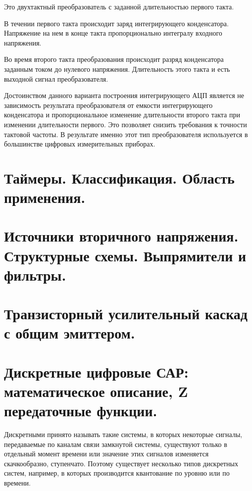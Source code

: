 \documentclass[unicode, 12pt, a4paper, oneside]{article}
\begin{document}
Это двухтактный преобразователь с заданной длительностью первого такта.

В течении первого такта происходит заряд интегрирующего конденсатора. Напряжение на нем в конце такта пропорционально интегралу входного напряжения.

Во время второго такта преобразования происходит разряд конденсатора заданным током до нулевого напряжения. Длительность этого такта и есть выходной сигнал преобразователя.

Достоинством данного варианта построения интегрирующего АЦП является не зависимость результата преобразователя от емкости интегрирующего конденсатора и пропорциональное изменение длительности второго такта при изменении длительности первого. Это позволяет снизить требования к точности тактовой частоты. В результате именно этот тип преобразователя используется в большинстве цифровых измерительных приборах.


\section{Таймеры. Классификация. Область применения.}
\section{Источники вторичного напряжения. Структурные схемы. Выпрямители и фильтры.}
\section{Транзисторный усилительный каскад с общим эмиттером.}


\section{Дискретные цифровые САР: математическое описание, Z передаточные функции.}

Дискретными принято называть такие системы, в которых некоторые сигналы, передаваемые по каналам связи замкнутой системы, существуют только в отдельный момент времени или значение этих сигналов изменяется скачкообразно, ступенчато. Поэтому существует несколько типов дискретных систем, например, в которых производится квантование по уровню или по времени. %
\end{document}
